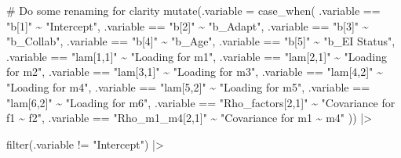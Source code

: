 \documentclass[
  letterpaper,
  DIV=11,
  numbers=noendperiod]{scrreprt}
\newenvironment{Shaded}{\begin{snugshade}}{\end{snugshade}}
\newcommand{\AttributeTok}[1]{\textcolor[rgb]{0.40,0.45,0.13}{#1}}
\newcommand{\CommentTok}[1]{\textcolor[rgb]{0.37,0.37,0.37}{#1}}
\newcommand{\FunctionTok}[1]{\textcolor[rgb]{0.28,0.35,0.67}{#1}}
\newcommand{\NormalTok}[1]{\textcolor[rgb]{0.00,0.23,0.31}{#1}}
\newcommand{\SpecialCharTok}[1]{\textcolor[rgb]{0.37,0.37,0.37}{#1}}
\newcommand{\StringTok}[1]{\textcolor[rgb]{0.13,0.47,0.30}{#1}}
\begin{document}
\begin{Shaded}
\begin{Highlighting}[]
  \CommentTok{\# Do some renaming for clarity}
  \FunctionTok{mutate}\NormalTok{(}\AttributeTok{.variable =} \FunctionTok{case\_when}\NormalTok{(}
\NormalTok{   .variable }\SpecialCharTok{==} \StringTok{"b[1]"} \SpecialCharTok{\textasciitilde{}} \StringTok{"Intercept"}\NormalTok{,}
\NormalTok{   .variable }\SpecialCharTok{==} \StringTok{"b[2]"} \SpecialCharTok{\textasciitilde{}} \StringTok{"b\_Adapt"}\NormalTok{,}
\NormalTok{   .variable }\SpecialCharTok{==} \StringTok{"b[3]"} \SpecialCharTok{\textasciitilde{}} \StringTok{"b\_Collab"}\NormalTok{,}
\NormalTok{   .variable }\SpecialCharTok{==} \StringTok{"b[4]"} \SpecialCharTok{\textasciitilde{}} \StringTok{"b\_Age"}\NormalTok{,}
\NormalTok{   .variable }\SpecialCharTok{==} \StringTok{"b[5]"} \SpecialCharTok{\textasciitilde{}} \StringTok{"b\_EI Status"}\NormalTok{,}
\NormalTok{   .variable }\SpecialCharTok{==} \StringTok{"lam[1,1]"} \SpecialCharTok{\textasciitilde{}} \StringTok{"Loading for m1"}\NormalTok{,}
\NormalTok{   .variable }\SpecialCharTok{==} \StringTok{"lam[2,1]"} \SpecialCharTok{\textasciitilde{}} \StringTok{"Loading for m2"}\NormalTok{,}
\NormalTok{   .variable }\SpecialCharTok{==} \StringTok{"lam[3,1]"} \SpecialCharTok{\textasciitilde{}} \StringTok{"Loading for m3"}\NormalTok{,}
\NormalTok{   .variable }\SpecialCharTok{==} \StringTok{"lam[4,2]"} \SpecialCharTok{\textasciitilde{}} \StringTok{"Loading for m4"}\NormalTok{,}
\NormalTok{   .variable }\SpecialCharTok{==} \StringTok{"lam[5,2]"} \SpecialCharTok{\textasciitilde{}} \StringTok{"Loading for m5"}\NormalTok{,}
\NormalTok{   .variable }\SpecialCharTok{==} \StringTok{"lam[6,2]"} \SpecialCharTok{\textasciitilde{}} \StringTok{"Loading for m6"}\NormalTok{,}
\NormalTok{   .variable }\SpecialCharTok{==} \StringTok{"Rho\_factors[2,1]"} \SpecialCharTok{\textasciitilde{}} \StringTok{"Covariance for f1 \textasciitilde{} f2"}\NormalTok{,}
\NormalTok{   .variable }\SpecialCharTok{==} \StringTok{"Rho\_m1\_m4[2,1]"} \SpecialCharTok{\textasciitilde{}} \StringTok{"Covariance for m1 \textasciitilde{} m4"}
\NormalTok{ )) }\SpecialCharTok{|\textgreater{}}

  \FunctionTok{filter}\NormalTok{(.variable }\SpecialCharTok{!=} \StringTok{"Intercept"}\NormalTok{) }\SpecialCharTok{|\textgreater{}}


\end{Highlighting}
\end{Shaded}
\end{document}
